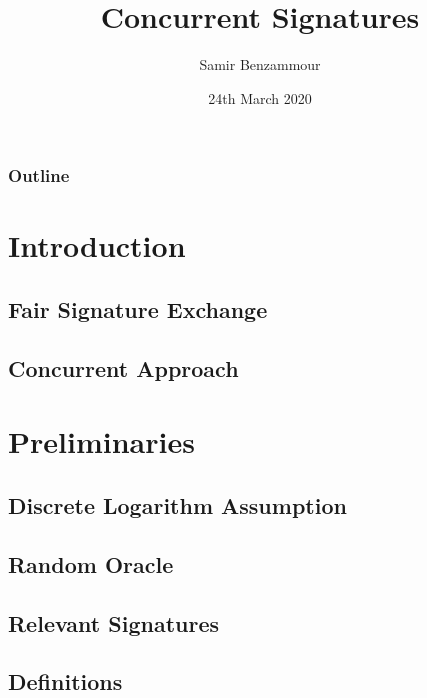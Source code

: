 \documentclass{beamer}
\title{Concurrent Signatures}
\author{Samir Benzammour}
\date{24th March 2020}
\institute[RWTH]{
  Algorithms and Computational Complexity\\
  RWTH Aachen University
}
\begin{document}
\frame{\titlepage}

\begin{frame}
	\frametitle{Outline}
	\tableofcontents
\end{frame}

\section{Introduction}


\subsection{Fair Signature Exchange}


\subsection{Concurrent Approach}


\section{Preliminaries}
% 

\subsection{Discrete Logarithm Assumption}


\subsection{Random Oracle}


\subsection{Relevant Signatures}


\subsection{Definitions}

\end{document}
